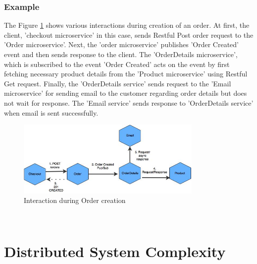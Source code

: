 \subsubsection{Example}\label{section:challanges_of_microservices_architecture/integration/example}
The Figure \ref{fig:challanges_of_microservices_architecture/integration/inter_service_communication/interaction_during_order_creation}  shows various interactions during creation of an order. At first, the client, 'checkout microservice' in this case, sends Restful Post order request to the 'Order microservice'. Next, the 'order microservice' publishes 'Order Created' event and then sends response to the client. The 'OrderDetails microservice', which is subscribed to the event 'Order Created' acts on the event by first fetching necessary product details from the 'Product microservice' using Restful Get request. Finally, the 'OrderDetails service' sends request to the 'Email microservice' for sending email to the customer regarding order details but does not wait for response. The 'Email service' sends response to 'OrderDetails service' when email is sent successfully.
\begin{figure}[H]
\begin{center}
\includegraphics[width=0.8\textwidth]{figures/challanges_two_interaction_example}
\caption{Interaction during Order creation}
\label{fig:challanges_of_microservices_architecture/integration/inter_service_communication/interaction_during_order_creation}
\end{center}
\end{figure}
\\

\section{Distributed System Complexity}\label{section:challanges_of_microservices_architecture/distributed_system}
